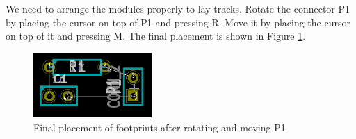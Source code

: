 We need to arrange the modules properly to lay tracks. Rotate the connector P1 by placing the cursor on top of P1 and pressing R. Move it by placing the cursor on top of it and pressing M. The final placement is shown in Figure \ref{fplace}.
\begin{figure}
\centering
\includegraphics[width=0.4\textwidth]{figures/fplace}
\caption{Final placement of footprints after rotating and moving P1}
\label{fplace}
\end{figure}

